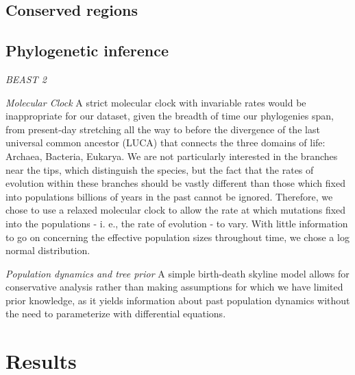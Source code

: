 \documentclass[10pt,letterpaper]{article}
\begin{document}
\subsection*{Conserved regions}


\subsection*{Phylogenetic inference}

\textit{BEAST 2}

\textit{Molecular Clock}
A strict molecular clock with invariable rates would be inappropriate for our dataset, given the breadth of time our phylogenies span, from present-day stretching all the way to before the divergence of the last universal common ancestor (LUCA) that connects the three domains of life: Archaea, Bacteria, Eukarya. 
We are not particularly interested in the branches near the tips, which distinguish the species, but the fact that the rates of evolution within these branches should be vastly different than those which fixed into populations billions of years in the past cannot be ignored.  Therefore, we chose to use a 
relaxed molecular clock to allow the rate at which mutations fixed into the populations - i. e., the rate of evolution - to vary.  With little information to go on concerning the effective population sizes throughout time, we chose a log normal distribution. 


\textit{Population dynamics and tree prior}
A simple birth-death skyline model allows for conservative analysis rather than making assumptions for which we have limited prior knowledge, as it yields information about past population dynamics without the need to parameterize with differential equations. \cite{coalSky} \cite{BDSKY}


\section*{Results}
\end{document}
